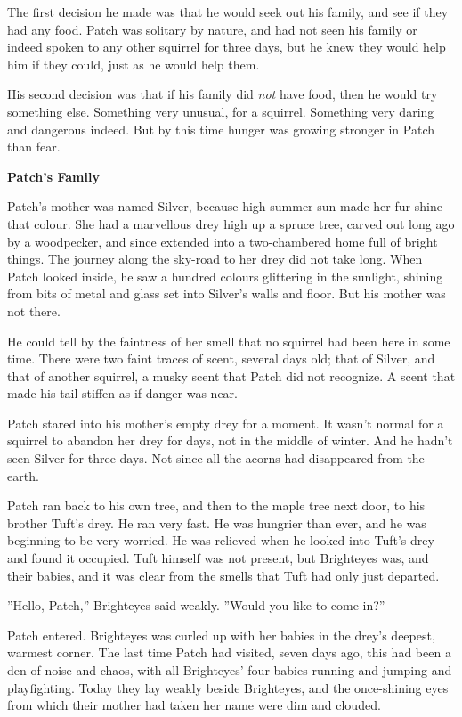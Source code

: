 \documentclass[11pt]{article}
\begin{document}
The first decision he made was that he would seek out his family, and see if they had any food. Patch was solitary by nature, and had not seen his family or indeed spoken to any other squirrel for three days, but he knew they would help him if they could, just as he would help them.\par
His second decision was that if his family did {\it not} have food, then %
 he would try something else. Something very unusual, for a squirrel. Something very daring and dangerous indeed. But by this time hunger was growing stronger in Patch than fear.\par
\par
{\bf Patch's Family\par
}\par
 Patch's mother was named Silver, because high summer sun made her fur shine that colour. She had a marvellous drey high up a spruce tree, carved out long ago by a woodpecker, and since extended into a two-chambered home full of bright things. The journey along the sky-road to her drey did not take long. When Patch looked inside, he saw a hundred colours glittering in the sunlight, shining from bits of metal and glass set into Silver's walls and floor. But his mother was not there.\par
He could tell by the faintness of her smell that no squirrel had been here in some time. There were two faint traces of scent, several days old; that of Silver, and that of another squirrel, a musky scent that Patch did not recognize. A scent that made his tail stiffen as if danger was near.\par
 Patch stared into his mother's empty drey for a moment. It wasn't normal for a squirrel to abandon her drey for days, not in the middle of winter. And he hadn't seen Silver for three days. Not since all the acorns had disappeared from the earth.\par
 Patch ran back to his own tree, and then to the maple tree next door, to his brother Tuft's drey. He ran very fast. He was hungrier than ever, and he was beginning to be very worried. He was relieved when he looked into Tuft's drey and found it occupied. Tuft himself was not present, but Brighteyes was, and their babies, and it was clear from the smells that Tuft had only just departed.\par
 ''Hello, Patch,'' Brighteyes said weakly. ''Would you like to come in?''\par
 Patch entered. Brighteyes was curled up with her babies in the drey's deepest, warmest corner. The last time Patch had visited, seven days ago, this had been a den of noise and chaos, with all Brighteyes' four babies running and jumping and playfighting. Today they lay weakly beside Brighteyes, and the once-shining eyes from which their mother had taken her name were dim and clouded.\par
\end{document}
